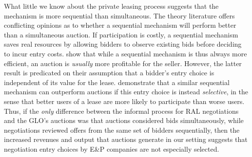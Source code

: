 What little we know about the private leasing process suggests that the mechanism is more sequential than simultaneous. The theory literature offers conflicting opinions as to whether a sequential mechanism will perform better than a simultaneous auction. If participation is costly, a sequential mechanism saves real resources by allowing bidders to observe existing bids before deciding to incur entry costs. \cite{bulow_why_2009} show that while a sequential mechanism is thus always more efficient, an auction is \emph{usually} more profitable for the seller. However, the latter result is predicated on their assumption that a bidder's entry choice is independent of its value for the lease.  \citet{roberts_when_2013} demonstrate that a similar sequential mechanism can outperform auctions if this entry choice is instead \emph{selective}, in the sense that better users of a lease are more likely to participate than worse users. Thus, if the \textit{only} difference between the informal process for RAL negotiations and the GLO's auctions was that auctions considered bids simultaneously, while negotiations reviewed offers from the same set of bidders sequentially, then the increased revenues and output that auctions generate in our setting suggests that negotiation entry choices by E\&P companies are not especially selected.

